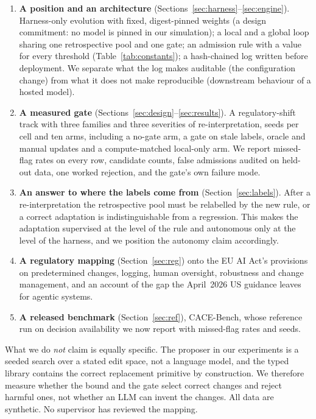 \documentclass[11pt]{article}
\begin{document}
\begin{enumerate}
\item \textbf{A position and an architecture} (Sections~\ref{sec:harness}--\ref{sec:engine}). Harness-only evolution with fixed, digest-pinned weights (a design commitment: no model is pinned in our simulation); a local and a global loop sharing one retrospective pool and one gate; an admission rule with a value for every threshold (Table~\ref{tab:constants}); a hash-chained log written before deployment. We separate what the log makes auditable (the configuration change) from what it does not make reproducible (downstream behaviour of a hosted model).
\item \textbf{A measured gate} (Sections~\ref{sec:design}--\ref{sec:results}). A regulatory-shift track with three families and three severities of re-interpretation, \nseeds{} seeds per cell and ten arms, including a no-gate arm, a gate on stale labels, oracle and manual updates and a compute-matched local-only arm. We report missed-flag rates on every row, candidate counts, false admissions audited on held-out data, one worked rejection, and the gate's own failure mode.
\item \textbf{An answer to where the labels come from} (Section~\ref{sec:labels}). After a re-interpretation the retrospective pool must be relabelled by the new rule, or a correct adaptation is indistinguishable from a regression. This makes the adaptation supervised at the level of the rule and autonomous only at the level of the harness, and we position the autonomy claim accordingly.
\item \textbf{A regulatory mapping} (Section~\ref{sec:reg}) onto the EU AI Act's provisions on predetermined changes, logging, human oversight, robustness and change management, and an account of the gap the April~2026 US guidance leaves for agentic systems.
\item \textbf{A released benchmark} (Section~\ref{sec:ref}), CACE-Bench, whose reference run on decision availability we now report with missed-flag rates and  seeds.
\end{enumerate}

What we do \emph{not} claim is equally specific. The proposer in our experiments is a seeded search over a stated edit space, not a language model, and the typed library contains the correct replacement primitive by construction. We therefore measure whether the bound and the gate select correct changes and reject harmful ones, not whether an LLM can invent the changes. All data are synthetic. No supervisor has reviewed the mapping.
\end{document}
